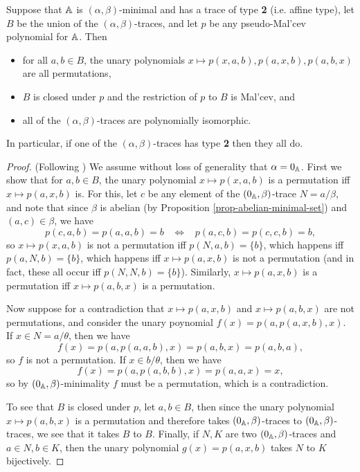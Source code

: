\begin{appendices}
\begin{thm} Suppose that $\mathbb{A}$ is $(\alpha,\beta)$-minimal and has a trace of type \textbf{2} (i.e. affine type), let $B$ be the union of the $(\alpha,\beta)$-traces, and let $p$ be any pseudo-Mal'cev polynomial for $\mathbb{A}$. Then
\begin{itemize}
\item for all $a,b \in B$, the unary polynomials $x \mapsto p(x,a,b), p(a,x,b), p(a,b,x)$ are all permutations,
\item $B$ is closed under $p$ and the restriction of $p$ to $B$ is Mal'cev, and
\item all of the $(\alpha,\beta)$-traces are polynomially isomorphic.
\end{itemize}
In particular, if one of the $(\alpha,\beta)$-traces has type \textbf{2} then they all do.
\end{thm}
\begin{proof} (Following \cite{hobby-mckenzie}) We assume without loss of generality that $\alpha = 0_{\mathbb{A}}$. First we show that for $a,b \in B$, the unary polynomial $x \mapsto p(x,a,b)$ is a permutation iff $x \mapsto p(a,x,b)$ is. For this, let $c$ be any element of the $(0_{\mathbb{A}},\beta)$-trace $N = a/\beta$, and note that since $\beta$ is abelian (by Proposition \ref{prop-abelian-minimal-set}) and $(a,c) \in \beta$, we have
\[
p(c,a,b) = p(a,a,b) = b \;\;\; \iff \;\;\; p(a,c,b) = p(c,c,b) = b,
\]
so $x \mapsto p(x,a,b)$ is not a permutation iff $p(N,a,b) = \{b\}$, which happens iff $p(a,N,b) = \{b\}$, which happens iff $x \mapsto p(a,x,b)$ is not a permutation (and in fact, these all occur iff $p(N,N,b) = \{b\}$). Similarly, $x \mapsto p(a,x,b)$ is a permutation iff $x \mapsto p(a,b,x)$ is a permutation.

Now suppose for a contradiction that $x \mapsto p(a,x,b)$ and $x \mapsto p(a,b,x)$ are not permutations, and consider the unary poynomial $f(x) = p(a,p(a,x,b),x)$. If $x \in N = a/\theta$, then we have
\[
f(x) = p(a,p(a,a,b),x) = p(a,b,x) = p(a,b,a),
\]
so $f$ is not a permutation. If $x \in b/\theta$, then we have
\[
f(x) = p(a,p(a,b,b),x) = p(a,a,x) = x,
\]
so by $(0_{\mathbb{A}},\beta)$-minimality $f$ must be a permutation, which is a contradiction.

To see that $B$ is closed under $p$, let $a,b \in B$, then since the unary polynomial $x \mapsto p(a,b,x)$ is a permutation and therefore takes $(0_{\mathbb{A}},\beta)$-traces to $(0_{\mathbb{A}},\beta)$-traces, we see that it takes $B$ to $B$. Finally, if $N, K$ are two $(0_{\mathbb{A}},\beta)$-traces and $a \in N, b \in K$, then the unary polynomial $g(x) = p(a,x,b)$ takes $N$ to $K$ bijectively.
\end{proof}


\end{appendices}
